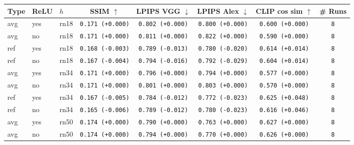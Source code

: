 \begin{tabular}{|l|l|l|c|c|c|c|c|}
\hline
Type & ReLU & $h$ & SSIM $\uparrow$ & LPIPS VGG $\downarrow$ & LPIPS Alex $\downarrow$ & CLIP cos sim $\uparrow$ & \# Runs \\
\hline
\rowcolor{verylightgray}avg & yes & rn18 & \texttt{0.171 {\color{black}(+0.000)}} & \texttt{0.802 {\color{black}(+0.000)}} & \texttt{0.800 {\color{black}(+0.000)}} & \texttt{0.600 {\color{black}(+0.000)}} & \texttt{8} \\
\rowcolor{verylightgray}avg & no & rn18 & \texttt{0.171 {\color{black}(+0.000)}} & \texttt{0.811 {\color{black}(+0.000)}} & \texttt{0.822 {\color{black}(+0.000)}} & \texttt{0.590 {\color{black}(+0.000)}} & \texttt{8} \\
\hline
ref & yes & rn18 & \texttt{0.168 {\color{red}(-0.003)}} & \texttt{0.789 {\color{green}(-0.013)}} & \texttt{0.780 {\color{green}(-0.020)}} & \texttt{0.614 {\color{green}(+0.014)}} & \texttt{8} \\
ref & no & rn18 & \texttt{0.167 {\color{red}(-0.004)}} & \texttt{0.794 {\color{green}(-0.016)}} & \texttt{0.792 {\color{green}(-0.029)}} & \texttt{0.604 {\color{green}(+0.014)}} & \texttt{8} \\
\hline
\rowcolor{verylightgray}avg & yes & rn34 & \texttt{0.171 {\color{black}(+0.000)}} & \texttt{0.796 {\color{black}(+0.000)}} & \texttt{0.794 {\color{black}(+0.000)}} & \texttt{0.577 {\color{black}(+0.000)}} & \texttt{8} \\
\rowcolor{verylightgray}avg & no & rn34 & \texttt{0.171 {\color{black}(+0.000)}} & \texttt{0.801 {\color{black}(+0.000)}} & \texttt{0.803 {\color{black}(+0.000)}} & \texttt{0.570 {\color{black}(+0.000)}} & \texttt{8} \\
\hline
ref & yes & rn34 & \texttt{0.167 {\color{red}(-0.005)}} & \texttt{0.784 {\color{green}(-0.012)}} & \texttt{0.772 {\color{green}(-0.023)}} & \texttt{0.625 {\color{green}(+0.048)}} & \texttt{8} \\
ref & no & rn34 & \texttt{0.165 {\color{red}(-0.006)}} & \texttt{0.789 {\color{green}(-0.012)}} & \texttt{0.780 {\color{green}(-0.023)}} & \texttt{0.616 {\color{green}(+0.046)}} & \texttt{8} \\
\hline
\rowcolor{verylightgray}avg & yes & rn50 & \texttt{0.174 {\color{black}(+0.000)}} & \texttt{0.790 {\color{black}(+0.000)}} & \texttt{0.763 {\color{black}(+0.000)}} & \texttt{0.627 {\color{black}(+0.000)}} & \texttt{8} \\
\rowcolor{verylightgray}avg & no & rn50 & \texttt{0.174 {\color{black}(+0.000)}} & \texttt{0.794 {\color{black}(+0.000)}} & \texttt{0.770 {\color{black}(+0.000)}} & \texttt{0.626 {\color{black}(+0.000)}} & \texttt{8} \\

\end{tabular}

